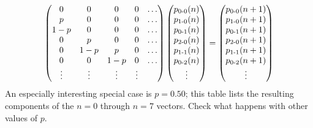\documentclass[c]{beamer}
\begin{document}
\begin{frame}
\begin{equation*}
  \begin{pmatrix}
    0      &0      &0      &0   &\ldots  \\
    p      &0      &0      &0   &\ldots  \\
    1-p    &0      &0      &0   &\ldots  \\
    0      &p      &0      &0   &\ldots  \\
    0      &1-p    &p      &0   &\ldots  \\
    0      &0      &1-p    &0   &\ldots  \\
    \vdots &\vdots &\vdots &\vdots
  \end{pmatrix}
  \begin{pmatrix} p_{\text{0-0}}(n) \\ p_{\text{1-0}}(n) \\ p_{\text{0-1}}(n) \\
           p_{\text{2-0}}(n) \\ p_{\text{1-1}}(n) \\ p_{\text{0-2}}(n) \\
  \vdots  \end{pmatrix}
  =
  \begin{pmatrix} p_{\text{0-0}}(n+1) \\ p_{\text{1-0}}(n+1) \\ p_{\text{0-1}}(n+1) \\
           p_{\text{2-0}}(n+1) \\ p_{\text{1-1}}(n+1) \\ p_{\text{0-2}}(n+1) \\
           \vdots  \end{pmatrix}
\end{equation*}
An especially interesting special case is $p=0.50$; this table lists the
resulting components of the $n=0$ through $n=7$ vectors. Check what happens with other values of $p$.
\end{frame}
\end{document}
